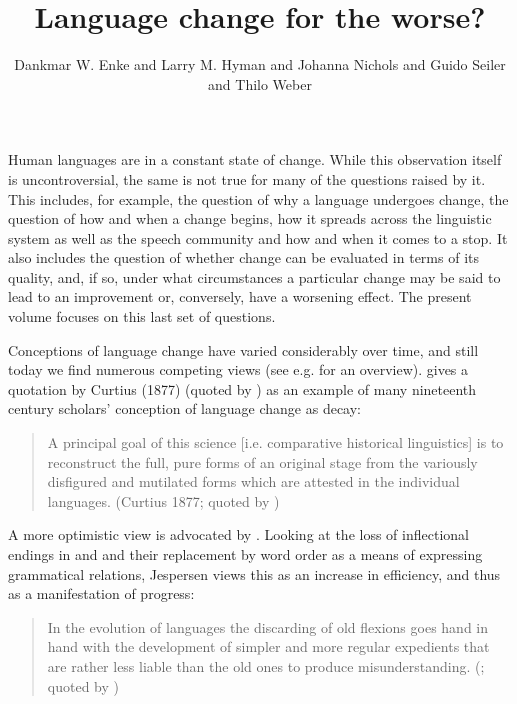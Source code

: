 \documentclass[output=paper,colorlinks,citecolor=brown]{langscibook}
\author{Dankmar W. Enke\affiliation{LMU Munich} and Larry M. Hyman\affiliation{UC Berkeley} and Johanna Nichols\affiliation{UC Berkeley} and Guido Seiler\affiliation{University of Zurich} and  Thilo Weber\affiliation{Leibniz Institute for the German Language (IDS), Mannheim}}
\title{Language change for the worse?}
\begin{document}
\maketitle

\noindent Human languages are in a constant state of change. While this observation itself is uncontroversial, the same is not true for many of the questions raised by it. This includes, for example, the question of why a language undergoes change, the question of how and when a change begins, how it spreads across the linguistic system as well as the speech community and how and when it comes to a stop. It also includes the question of whether change can be evaluated in terms of its quality, and, if so, under what circumstances a particular change may be said to lead to an improvement or, conversely, have a worsening effect. The present volume focuses on this last set of questions.

Conceptions of language change have varied considerably over time, and still today we find numerous competing views (see e.g. \citealt{Aitchison_2001} for an overview). \citet[251]{Aitchison_2001} gives a quotation by Curtius (1877) (quoted by \citealt[35]{Kiparsky_1972}) as an example of many nineteenth century scholars' conception of language change as decay:

\begin{quote}
A principal goal of this science [i.e. comparative historical linguistics] is to reconstruct the full, pure forms of an original stage from the variously disfigured and mutilated forms which are attested in the individual languages. (Curtius 1877; quoted by \citealt[251]{Aitchison_2001})
\end{quote}

A more optimistic view is advocated by
\citet{Jespersen_1922}. Looking at the loss of inflectional endings in  and  and their replacement by word order as a means of expressing grammatical relations, Jespersen views this as an increase in efficiency, and thus as a manifestation of progress: 

\begin{quote}
In the evolution of languages the discarding of old flexions goes hand in hand with the development of simpler and more regular expedients that are rather less liable than the old ones to produce misunderstanding.  (\citealt{Jespersen_1922}; quoted by \citealt[7]{Aitchison_2001})
\end{quote}
\end{document}
